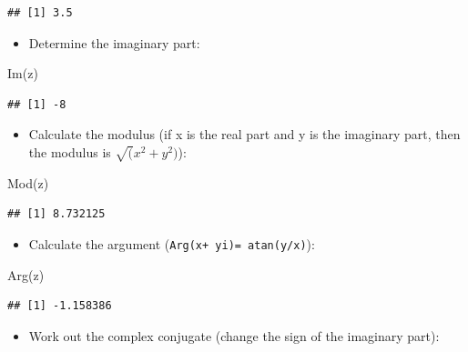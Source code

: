 \documentclass[
]{book}
\newenvironment{Shaded}{\begin{snugshade}}{\end{snugshade}}
\newcommand{\FunctionTok}[1]{\textcolor[rgb]{0.00,0.00,0.00}{#1}}
\newcommand{\NormalTok}[1]{#1}
\providecommand{\tightlist}{%
  \setlength{\itemsep}{0pt}\setlength{\parskip}{0pt}}
\begin{document}
\begin{verbatim}
## [1] 3.5
\end{verbatim}

\begin{itemize}
\tightlist
\item
  Determine the imaginary part:
\end{itemize}

\begin{Shaded}
\begin{Highlighting}[]
\FunctionTok{Im}\NormalTok{(z)}
\end{Highlighting}
\end{Shaded}

\begin{verbatim}
## [1] -8
\end{verbatim}

\begin{itemize}
\tightlist
\item
  Calculate the modulus (if x is the real part and y is the imaginary part, then the modulus is \(\sqrt(x^2 + y^2)\)):
\end{itemize}

\begin{Shaded}
\begin{Highlighting}[]
\FunctionTok{Mod}\NormalTok{(z)}
\end{Highlighting}
\end{Shaded}

\begin{verbatim}
## [1] 8.732125
\end{verbatim}

\begin{itemize}
\tightlist
\item
  Calculate the argument (\texttt{Arg(x+\ yi)=\ atan(y/x)}):
\end{itemize}

\begin{Shaded}
\begin{Highlighting}[]
\FunctionTok{Arg}\NormalTok{(z)}
\end{Highlighting}
\end{Shaded}

\begin{verbatim}
## [1] -1.158386
\end{verbatim}

\begin{itemize}
\tightlist
\item
  Work out the complex conjugate (change the sign of the imaginary part):
\end{itemize}
\end{document}
